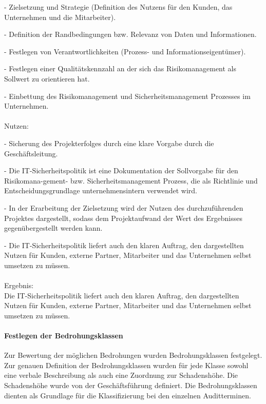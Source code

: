 - Zielsetzung und Strategie (Definition des Nutzens für den Kunden, das Unternehmen und die Mitarbeiter).

- Definition der Randbedingungen bzw. Relevanz von Daten und Informationen.

- Festlegen von Verantwortlichkeiten (Prozess- und Informationseigentümer).

- Festlegen einer Qualitätskennzahl an der sich das Risikomanagement als Sollwert zu orientieren hat.

- Einbettung des Risikomanagement und Sicherheitsmanagement Prozesses im Unternehmen.
\\
\\
Nutzen:

- Sicherung des Projekterfolges durch eine klare Vorgabe durch die Geschäftsleitung.

- Die IT-Sicherheitspolitik ist eine Dokumentation der Sollvorgabe für den Risikomana-gement- bzw. Sicherheitsmanagement Prozess, die als Richtlinie und Entscheidungsgrundlage unternehmensintern verwendet wird.

- In der Erarbeitung der Zielsetzung wird der Nutzen des durchzuführenden Projektes dargestellt, sodass dem Projektaufwand der Wert des Ergebnisses gegenübergestellt werden kann.

- Die IT-Sicherheitspolitik liefert auch den klaren Auftrag, den dargestellten Nutzen für Kunden, externe Partner, Mitarbeiter und das Unternehmen selbst umsetzen zu müssen.
\\
\\
Ergebnis:\\
Die IT-Sicherheitspolitik liefert auch den klaren Auftrag, den dargestellten Nutzen für Kunden, externe Partner, Mitarbeiter und das Unternehmen selbst umsetzen zu müssen.

\paragraph {Festlegen der Bedrohungsklassen}
Zur Bewertung der möglichen Bedrohungen wurden Bedrohungsklassen festgelegt. Zur genauen Definition der Bedrohungsklassen wurden für jede Klasse sowohl eine verbale Beschreibung als auch eine Zuordnung zur Schadenshöhe. Die Schadenshöhe wurde von der Geschäftsführung definiert. Die Bedrohungsklassen dienten als Grundlage für die Klassifizierung bei den einzelnen Auditterminen.
